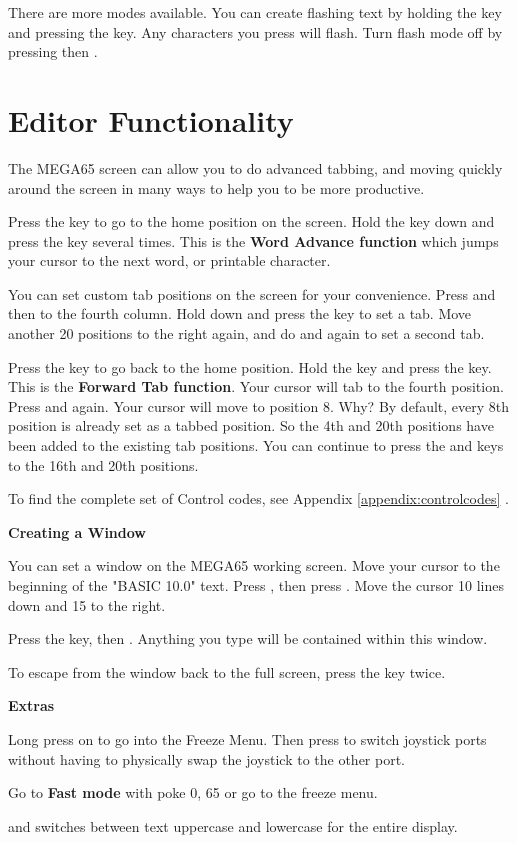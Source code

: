 There are more modes available. You can create flashing text by holding the  key and pressing the  key. Any characters you press will flash. Turn flash mode off by pressing  then .



\section{Editor Functionality}


The MEGA65 screen can allow you to do advanced tabbing, and moving quickly around the screen in many ways to help you to be more productive.

Press the  key to go to the home position on the screen. Hold the  key down and press the  key several times. This is the \textbf{Word Advance function} which jumps your cursor to the next word, or printable character.

You can set custom tab positions on the screen for your convenience. Press  and then \megakey{$\rightarrow$} to the fourth column. Hold down  and press the  key to set a tab. Move another 20 positions to the right again, and do  and  again to set a second tab.

Press the  key to go back to the home position. Hold the  key and press the  key. This is the \textbf{Forward Tab function}. Your cursor will tab to the fourth position. Press  and  again. Your cursor will move to position 8. Why? By default, every 8th position is already set as a tabbed position. So the 4th and 20th positions have been added to the existing tab positions. You can continue to press the  and  keys to the 16th and 20th positions.

To find the complete set of Control codes, see Appendix \ref{appendix:controlcodes}  .


\newpage



\textbf{Creating a Window}

You can set a window on the MEGA65 working screen. Move your cursor to the beginning of the "BASIC 10.0" text. Press , then press . Move the cursor 10 lines down and 15 to the right.

Press the  key, then . Anything you type will be contained within this window.

To escape from the window back to the full screen, press the  key twice.


\textbf{Extras}

Long press on  to go into the Freeze Menu.  Then press  to switch joystick ports without having to physically swap the joystick to the other port.

Go to \textbf{Fast mode} with poke 0, 65 or go to the freeze menu.

 and  switches between text uppercase and lowercase for the entire display.
